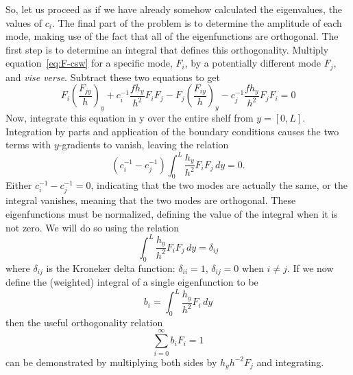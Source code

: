 \documentclass[11pt]{report}
\numberwithin{equation}{section}
\begin{document}
So, let us proceed as if we have already somehow calculated the eigenvalues, the values of $c_i$. The final part of the problem is to determine the amplitude of each mode, making use of the fact that all of the eigenfunctions are orthogonal.  The first step is to determine an integral that defines this orthogonality.  Multiply equation~\ref{eq:F-csw} for a specific mode, $F_i$, by a potentially different mode $F_j$, and {\it vise verse}.  Subtract these two equations to get
\begin{equation}
     F_i\left( \frac{F_{jy}}{h}  \right)_y + c_i^{-1} \frac{f h_y}{h^2} F_i F_j
   - F_j\left( \frac{F_{iy}}{h}  \right)_y - c_j^{-1} \frac{f h_y}{h^2} F_j F_i = 0
\end{equation}
Now, integrate this equation in y over the entire shelf from $y=[0, L]$.  Integration by parts and application of the boundary conditions causes the two terms with $y$-gradients to vanish, leaving the relation
\begin{equation}
    \left( c_i^{-1} - c_j^{-1} \right) \int_0^L \frac{h_y}{h^2} F_i F_j \, dy = 0.
\end{equation}
Either $c_i^{-1} - c_j^{-1} = 0$, indicating that the two modes are actually the same, or the integral vanishes, meaning that the two modes are orthogonal.  These eigenfunctions must be normalized, defining the value of the integral when it is not zero.  We will do so using the relation
\begin{equation}
    \int_0^L \frac{h_y}{h^2} F_i F_j \,dy = \delta_{ij}
\end{equation}
where $\delta_{ij}$ is the Kroneker delta function: $\delta_{ii} = 1$, $\delta_{ij}=0$ when $i \ne j$.  If we now define the (weighted) integral of a single eigenfunction to be
\begin{equation}
    \label{eq:csw-mode-norm-amp}
    b_i = \int_0^L \frac{h_y}{h^2} F_i\,dy
\end{equation}
then the useful orthogonality relation
\begin{equation}
    \label{eq:csw-flatforce}
    \sum_{i=0}^\infty b_i F_i = 1
\end{equation}
can be demonstrated by multiplying both sides by $h_y h^{-2} F_j$ and integrating.
\end{document}
